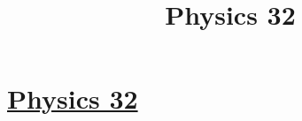 \documentclass[fleqn]{article}
\title{\vspace{1mm}Physics 32}
\date{}
\begin{document}
\newcommand{\myint}[4]{\int_{#1}^{#2} \!  #3  \, \mathrm{d} #4}
\newcommand{\paren}[1]{\!\left({#1}\right)}
\newcommand{\commutator}[2]{\left[ #1\, , #2\right]}
\newcommand{\expec}[1]{\! \left\langle {#1}\right\rangle}
\newcommand{\expect}[1]{\! \langle {#1}\rangle}
\newcommand{\mysum}[3]{\sum_{#1}^{#2} \, #3 }
\newcommand{\pdiv}[3]{ \frac{\partial^{#3}{#1}}{\partial{#2}^{#3} } }
\newcommand{\deriv}[3]{ \frac{\mathrm{d}^{#3}{#1}}{\mathrm{d}{#2}^{#3} } }
\newcommand{\braket}[1]{\!\left| #1 \right\rangle}
\newcommand{\half}[0]{\frac{1}{2}}


\section*{\centering \underline{Physics 32}}
\end{document}
